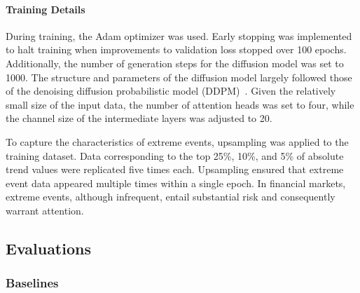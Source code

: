 \documentclass{article}
\begin{document}
\paragraph{Training Details}

During training, the Adam optimizer was used.
Early stopping was implemented to halt training when improvements to validation loss stopped over 100 epochs. Additionally, the number of generation steps for the diffusion model was set to 1000. The structure and parameters of the diffusion model largely followed those of the denoising diffusion probabilistic model (DDPM)~\cite{ho2020denoising}. Given the relatively small size of the input data, the number of attention heads was set to four, while the channel size of the intermediate layers was adjusted to 20.


To capture the characteristics of extreme events, upsampling was applied to the training dataset. Data corresponding to the top 25\%, 10\%, and 5\% of absolute trend values were replicated five times each. Upsampling ensured that extreme event data appeared multiple times within a single epoch. In financial markets, extreme events, although infrequent, entail substantial risk and consequently warrant attention.






\subsection{Evaluations}
\subsubsection{Baselines}
\end{document}
